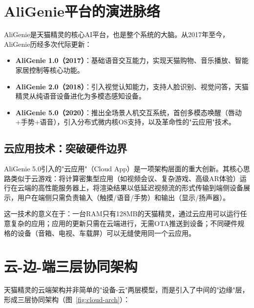 \documentclass[12pt, a4paper, twoside, openright]{book}
\begin{document}
\section{AliGenie平台的演进脉络}

AliGenie是天猫精灵的核心AI平台，也是整个系统的大脑。从2017年至今，AliGenie历经多次代际更新：

\begin{itemize}
  \item \textbf{AliGenie 1.0（2017）}：基础语音交互能力，实现天猫购物、音乐播放、智能家居控制等核心功能。
  \item \textbf{AliGenie 2.0（2018）}：引入视觉认知能力，支持人脸识别、视觉问答，天猫精灵从纯语音设备进化为多模态感知设备。
  \item \textbf{AliGenie 5.0（2020）}：推出全场景人机交互系统，首创多模态唤醒（唇动+手势+语音），引入分布式微内核OS支持，以及革命性的"云应用"技术。
\end{itemize}

\subsection{云应用技术：突破硬件边界}

AliGenie 5.0引入的"云应用"（Cloud App）是一项架构层面的重大创新。其核心思路类似于云游戏：将计算密集型应用（如视频会议、复杂游戏、高级AR体验）运行在云端的高性能服务器上，将渲染结果以低延迟视频流的形式传输到端侧设备展示，用户在端侧只需负责输入（触摸/语音/手势）和输出（显示/扬声器）。

这一技术的意义在于：一台RAM只有128MB的天猫精灵，通过云应用可以运行任意复杂的应用；应用的更新只需在云端进行，无需OTA推送到设备；不同硬件规格的设备（音箱、电视、车载屏）可以无缝使用同一个云应用。

\section{云-边-端三层协同架构}

天猫精灵的云端架构并非简单的"设备-云"两层模型，而是引入了中间的"边缘"层，形成三层协同架构（图~\ref{fig:cloud-arch}）：
\end{document}

